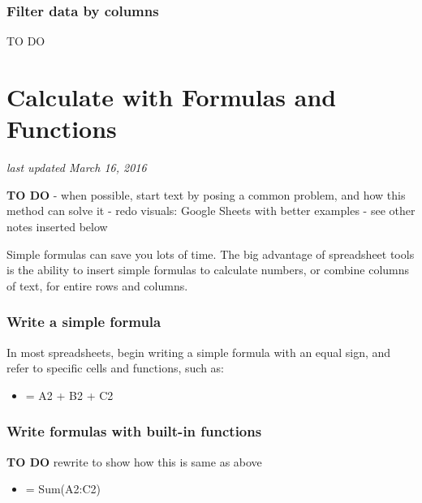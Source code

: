 \documentclass[
  english,
]{book}
\providecommand{\tightlist}{%
  \setlength{\itemsep}{0pt}\setlength{\parskip}{0pt}}
\begin{document}
\hypertarget{filter-data-by-columns}{%
\subsubsection*{Filter data by columns}\label{filter-data-by-columns}}

TO DO

\hypertarget{calculate}{%
\section{Calculate with Formulas and Functions}\label{calculate}}

\emph{last updated March 16, 2016}

\textbf{TO DO}
- when possible, start text by posing a common problem, and how this method can solve it
- redo visuals: Google Sheets with better examples
- see other notes inserted below

Simple formulas can save you lots of time. The big advantage of spreadsheet tools is the ability to insert simple formulas to calculate numbers, or combine columns of text, for entire rows and columns.

\hypertarget{write-a-simple-formula}{%
\subsubsection*{Write a simple formula}\label{write-a-simple-formula}}

In most spreadsheets, begin writing a simple formula with an equal sign, and refer to specific cells and functions, such as:

\begin{itemize}
\tightlist
\item
  = A2 + B2 + C2
\end{itemize}

\hypertarget{write-formulas-with-built-in-functions}{%
\subsubsection*{Write formulas with built-in functions}\label{write-formulas-with-built-in-functions}}

\textbf{TO DO} rewrite to show how this is same as above

\begin{itemize}
\tightlist
\item
  = Sum(A2:C2)
\end{itemize}
\end{document}
